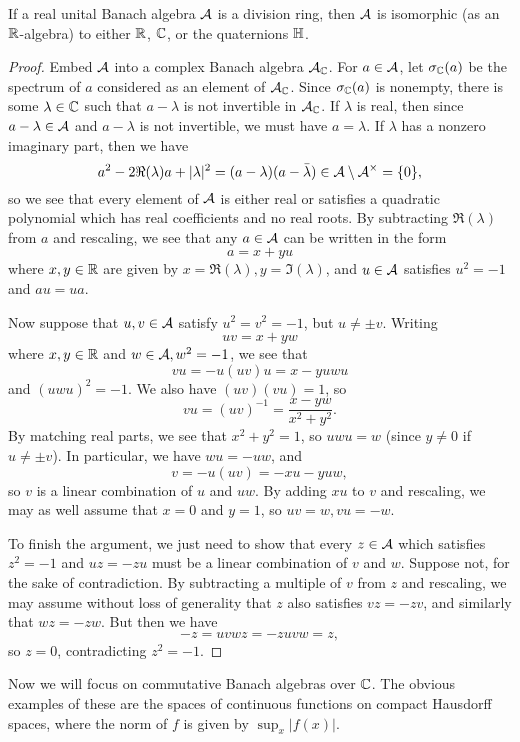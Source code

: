 \begin{cor} If a real unital Banach algebra $\mathcal{A}$ is a division ring, then $\mathcal{A}$ is isomorphic (as an $\mathbb{R}$-algebra) to either $\mathbb{R}$, $\mathbb{C}$, or the quaternions $\mathbb{H}$.
\end{cor}
\begin{proof} Embed $\mathcal{A}$ into a complex Banach algebra $\mathcal{A}_{\mathbb{C}}$. For $a \in \mathcal{A}$, let $\sigma_{\mathbb{C}}(a)$ be the spectrum of $a$ considered as an element of $\mathcal{A}_{\mathbb{C}}$. Since $\sigma_{\mathbb{C}}(a)$ is nonempty, there is some $\lambda \in \mathbb{C}$ such that $a - \lambda$ is not invertible in $\mathcal{A}_{\mathbb{C}}$. If $\lambda$ is real, then since $a - \lambda \in \mathcal{A}$ and $a - \lambda$ is not invertible, we must have $a = \lambda$. If $\lambda$ has a nonzero imaginary part, then we have
\[
a^2 - 2\Re(\lambda)a + |\lambda|^2 = (a-\lambda)(a - \bar{\lambda}) \in \mathcal{A} \setminus \mathcal{A}^\times = \{0\},
\]
so we see that every element of $\mathcal{A}$ is either real or satisfies a quadratic polynomial which has real coefficients and no real roots. By subtracting $\Re(\lambda)$ from $a$ and rescaling, we see that any $a \in \mathcal{A}$ can be written in the form
\[
a = x + yu
\]
where $x,y \in \mathbb{R}$ are given by $x = \Re(\lambda), y = \Im(\lambda)$, and $u \in \mathcal{A}$ satisfies $u^2 = -1$ and $au = ua$.

Now suppose that $u,v \in \mathcal{A}$ satisfy $u^2 = v^2 = -1$, but $u \ne \pm v$. Writing
\[
uv = x + yw
\]
where $x,y \in \mathbb{R}$ and $w \in \mathcal{A}, w^2 = -1$, we see that
\[
vu = -u(uv)u = x - yuwu
\]
and $(uwu)^2 = -1$. We also have $(uv)(vu) = 1$, so
\[
vu = (uv)^{-1} = \frac{x - yw}{x^2 + y^2}.
\]
By matching real parts, we see that $x^2 + y^2 = 1$, so $uwu = w$ (since $y \ne 0$ if $u \ne \pm v$). In particular, we have $wu = -uw$, and
\[
v = -u(uv) = -xu - yuw,
\]
so $v$ is a linear combination of $u$ and $uw$. By adding $xu$ to $v$ and rescaling, we may as well assume that $x = 0$ and $y = 1$, so $uv = w, vu = -w$.

To finish the argument, we just need to show that every $z \in \mathcal{A}$ which satisfies $z^2 = -1$ and $uz = -zu$ must be a linear combination of $v$ and $w$. Suppose not, for the sake of contradiction. By subtracting a multiple of $v$ from $z$ and rescaling, we may assume without loss of generality that $z$ also satisfies $vz = -zv$, and similarly that $wz = -zw$. But then we have
\[
-z = uvwz = -zuvw = z,
\]
so $z = 0$, contradicting $z^2 = -1$.
\end{proof}

Now we will focus on commutative Banach algebras over $\mathbb{C}$. The obvious examples of these are the spaces of continuous functions on compact Hausdorff spaces, where the norm of $f$ is given by $\sup_x |f(x)|$.


